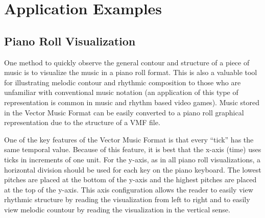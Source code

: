 
\section{Application Examples}

\subsection{Piano Roll Visualization}

One method to quickly observe the general contour and structure of a piece of music is to visualize the music in a piano roll format. This is also a valuable tool for illustrating melodic contour and rhythmic composition to those who are unfamiliar with conventional music notation (an application of this type of representation is common in music and rhythm based video games). Music stored in the Vector Music Format can be easily converted to a piano roll graphical representation due to the structure of a VMF file.

One of the key features of the Vector Music Format is that every ``tick'' has the same temporal value. Because of this feature, it is best that the x-axis (time) uses ticks in increments of one unit. For the y-axis, as in all piano roll visualizations, a horizontal division should be used for each key on the piano keyboard. The lowest pitches are placed at the bottom of the y-axis and the highest pitches are placed at the top of the y-axis. This axis configuration allows the reader to easily view rhythmic structure by reading the visualization from left to right and to easily view melodic countour by reading the visualization in the vertical sense.

